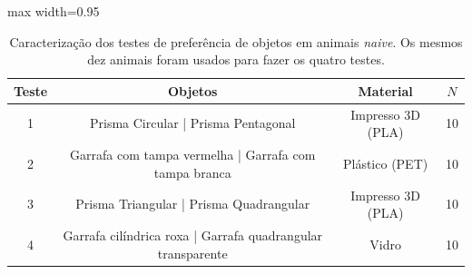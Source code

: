 \begin{table}[tbp]
    \centering
    \small
    \setlength{\tabcolsep}{4pt}
    \caption{Caracterização dos testes de preferência de objetos em animais \emph{naive}. Os mesmos dez animais foram usados para fazer os quatro testes.}
    \label{tab:testes_preferencia}
    \begin{adjustbox}{max width=0.95\textwidth}
        \begin{tabular}{cccc}
            \toprule
            Teste & Objetos                                                     & Material          & $N$ \\
            \midrule
            1     & Prisma Circular | Prisma Pentagonal                         & Impresso 3D (PLA) & 10  \\
            2     & Garrafa com tampa vermelha | Garrafa com tampa branca       & Plástico (PET)    & 10  \\
            3     & Prisma Triangular | Prisma Quadrangular                     & Impresso 3D (PLA) & 10  \\
            4     & Garrafa cilíndrica roxa | Garrafa quadrangular transparente & Vidro             & 10  \\
            \bottomrule
        \end{tabular}
    \end{adjustbox}
\end{table}